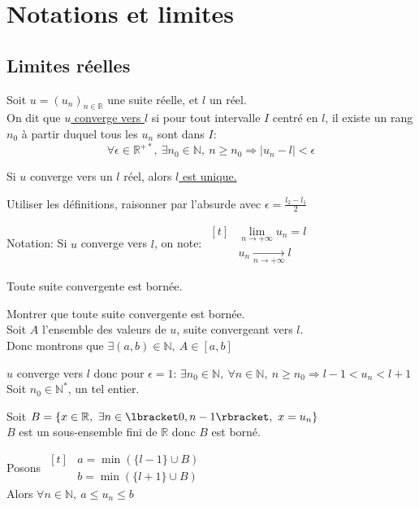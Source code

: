 \documentclass[12pt,twoside,a4paper]{article}
\begin{document}
	\section{Notations et limites}
		\subsection{Limites r\'eelles}
			\begin{defi}
				Soit $u=(u_n)_{n\in\mathbb{R}}$ une suite r\'eelle, et $l$ un r\'eel.\\
				On dit que \underline{$u$ converge vers $l$} si pour tout intervalle $I$ centr\'e en $l$, il existe un rang $n_0$ \`a partir duquel tous les $u_n$ sont dans $I$:
				$$\forall\epsilon\in\mathbb{R}^{+*},\ \exists n_0\in\mathbb{N},\ n\geqslant n_0\Rightarrow|u_n-l|<\epsilon$$
			\end{defi}
			\begin{prop}
				Si $u$ converge vers un $l$ r\'eel, alors \underline{$l$ est unique.}
			\end{prop}
			\begin{preuve}
				Utiliser les d\'efinitions, raisonner par l'absurde avec $\epsilon=\frac{l_2-l_1}{2}$
			\end{preuve}
			\begin{flushleft}
				Notation: Si $u$ converge vers $l$, on note: $\begin{aligned}[t]&\lim\limits_{n\rightarrow+\infty}u_n=l\\& u_n\mathop{\longrightarrow}\limits_{n\rightarrow+\infty}l \end{aligned}$
			\end{flushleft}
			\begin{prop}
				Toute suite convergente est born\'ee.
			\end{prop}
			\begin{preuve}
				Montrer que toute suite convergente est born\'ee.\\
				Soit $A$ l'ensemble des valeurs de $u$, suite convergeant vers $l$.\\
				Donc montrons que $\exists(a,b)\in\mathbb{N},\ A\in[a,b]$
				\begin{liste}
					\item $u$ converge vers $l$ donc pour $\epsilon=1$: $\exists n_0\in\mathbb{N},\ \forall n\in\mathbb{N},\ n\geqslant n_0\Rightarrow l-1<u_n<l+1$\\
						Soit $n_0\in\mathbb{N}^*$, un tel entier.
					\item Soit $B=\{x\in\mathbb{R},\ \exists n\in\lbracket 0,n-1\rbracket,\ x=u_n \}$\\
						$B$ est un sous-ensemble fini de $\mathbb{R}$ donc $B$ est born\'e.
				\end{liste}
				Posons $\begin{aligned}[t]&a=\min(\{l-1\}\cup B)\\&b=\min(\{l+1\}\cup B)\end{aligned}$\\
				Alors $\forall n\in\mathbb{N},\ a\leqslant u_n\leqslant b$
			\end{preuve}
\end{document}
